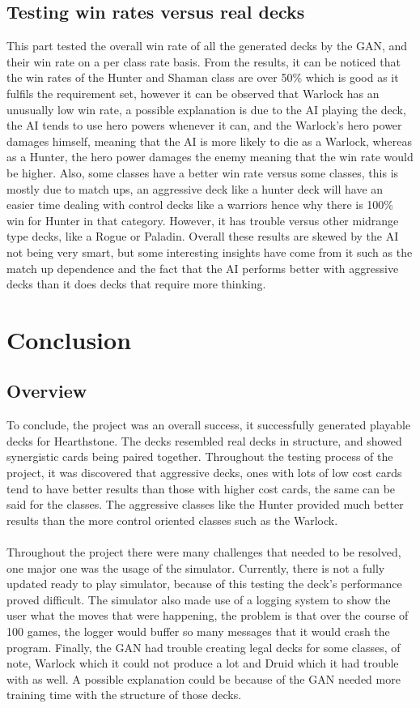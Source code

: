 \documentclass{report} %
\begin{document}
\subsection{Testing win rates versus real decks}
This part tested the overall win rate of all the generated decks by the GAN, and their win rate on a per class rate basis. From the results, it can be noticed that the win rates of the Hunter and Shaman class are over 50\% which is good as it fulfils the requirement set, however it can be observed that Warlock has an unusually low win rate, a possible explanation is due to the AI playing the deck, the AI tends to use hero powers whenever it can, and the Warlock's hero power damages himself, meaning that the AI is more likely to die as a Warlock, whereas as a Hunter, the hero power damages the enemy meaning that the win rate would be higher. Also, some classes have a better win rate versus some classes, this is mostly due to match ups, an aggressive deck like a hunter deck will have an easier time dealing with control decks like a warriors hence why there is 100\% win for Hunter in that category. However, it has trouble versus other midrange type decks, like a Rogue or Paladin. Overall these results are skewed by the AI not being very smart, but some interesting insights have come from it such as the match up dependence and the fact that the AI performs better with aggressive decks than it does decks that require more thinking.


\section{Conclusion}
\subsection{Overview}
To conclude, the project was an overall success, it successfully generated playable decks for Hearthstone. The decks resembled real decks in structure, and showed synergistic cards being paired together. Throughout the testing process of the project, it was discovered that aggressive decks, ones with lots of low cost cards tend to have better results than those with higher cost cards, the same can be said for the classes. The aggressive classes like the Hunter provided much better results than the more control oriented classes such as the Warlock. \\
\\
Throughout the project there were many challenges that needed to be resolved, one major one was the usage of the simulator. Currently, there is not a fully updated ready to play simulator, because of this testing the deck's performance proved difficult. The simulator also made use of a logging system to show the user what the moves that were happening, the problem is that over the course of 100 games, the logger would buffer so many messages that it would crash the program. Finally, the GAN had trouble creating legal decks for some classes, of note, Warlock which it could not produce a lot and Druid which it had trouble with as well. A possible explanation could be because of the GAN needed more training time with the structure of those decks.
\end{document}
